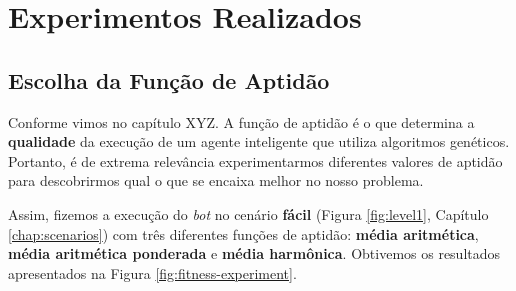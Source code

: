 \section{\label{section:experiments}Experimentos Realizados}

\subsection{Escolha da Função de Aptidão}


Conforme vimos no capítulo XYZ. A função de aptidão é o que determina a
\textbf{qualidade} da execução de um agente inteligente que utiliza algoritmos
genéticos. Portanto, é de extrema relevância experimentarmos diferentes valores
de aptidão para descobrirmos qual o que se encaixa melhor no nosso problema.

Assim, fizemos a execução do \textit{bot} no cenário \textbf{fácil} (Figura
\ref{fig:level1}, Capítulo \ref{chap:scenarios}) com três diferentes funções de
aptidão: \textbf{média aritmética}, \textbf{média aritmética ponderada} e
\textbf{média harmônica}. Obtivemos os resultados apresentados na Figura
\ref{fig:fitness-experiment}.

